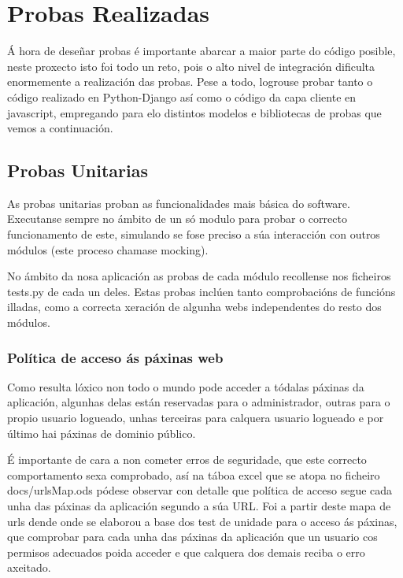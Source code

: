 \chapter{Probas Realizadas}

Á hora de deseñar probas é importante abarcar a maior parte do código posible, neste proxecto isto
foi todo un reto, pois o alto nivel de integración dificulta enormemente a realización das probas.
Pese a todo, logrouse probar tanto o código realizado en Python-Django así como o código da capa 
cliente en javascript, empregando para elo distintos modelos e bibliotecas de probas que vemos a
continuación.

\section{Probas Unitarias}

    As probas unitarias proban as funcionalidades mais básica do software. Executanse sempre no 
    ámbito de un só modulo para probar o correcto funcionamento de este, simulando se fose preciso 
    a súa interacción con outros módulos (este proceso chamase mocking).
    
    No ámbito da nosa aplicación as probas de cada módulo recollense nos ficheiros tests.py de cada
    un deles. Estas probas inclúen tanto comprobacións de funcións illadas, como a correcta xeración
    de algunha webs independentes do resto dos módulos.
    
    \subsection{Política de acceso ás páxinas web}
        Como resulta lóxico non todo o mundo pode acceder a tódalas páxinas da aplicación, algunhas
        delas están reservadas para o administrador, outras para o propio usuario logueado, unhas
        terceiras para calquera usuario logueado e por último hai páxinas de dominio público.
        
        É importante de cara a non cometer erros de seguridade, que este correcto comportamento sexa
        comprobado, así na táboa excel que se atopa no ficheiro docs/urlsMap.ods pódese observar con
        detalle que política de acceso segue cada unha das páxinas da aplicación segundo a súa URL.
        Foi a partir deste mapa de urls dende onde se elaborou a base dos test de unidade para 
        o acceso ás páxinas, que comprobar para cada unha das páxinas da aplicación que un usuario
        cos permisos adecuados poida acceder e que calquera dos demais reciba o erro axeitado.
        
